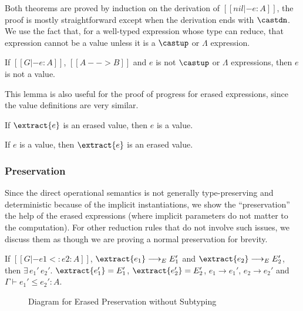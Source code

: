 \noindent Both theorems are proved by induction on the derivation of $[[nil |- e : A]]$,
the proof is mostly straightforward except when the derivation ends with $\castdn$.
We use the fact that, for a well-typed expression whose type can reduce, that expression
cannot be a value unless it is a $\castup$ or $\Lambda$ expression.

\begin{lemma}
    If $[[G |- e : A]]$, $[[A --> B]]$ and $e$ is not $\castup$ or $\Lambda$ expressions,
    then $e$ is not a value.
\end{lemma}

This lemma is also useful for the proof of progress for erased expressions, since the
value definitions are very similar.

\begin{lemma}
    If $\extract{e}$ is an erased value, then $e$ is a value.
\end{lemma}

\begin{lemma}
    If $e$ is a value, then $\extract{e}$ is an erased value.
\end{lemma}


\subsubsection{Preservation}

Since the direct operational semantics is not generally type-preserving and
deterministic because of the implicit instantiations, we show the
``preservation'' the help of the erased expressions (where implicit parameters
do not matter to the computation). For other reduction rules that do not involve
such issues, we discuss them as though we are proving a normal preservation
for brevity.

\begin{theorem}
    If $[[G |- e1 <: e2 : A]]$, $\extract{e_1} \longrightarrow_E E_1'$ and $\extract{e_2} \longrightarrow_E E_2'$,
    then $\exists\,e_1' \, e_2'.$ $\extract{e_1'} = E_1'$, $\extract{e_2'} = E_2'$, $e_1 \longrightarrow e_1'$, $e_2 \longrightarrow e_2'$ and $\Gamma \vdash e_1' \le e_2' : A$.
\end{theorem}

\begin{figure}
    \centering
    \caption{Diagram for Erased Preservation without Subtyping}
    \label{fig:preservation}
\end{figure}


